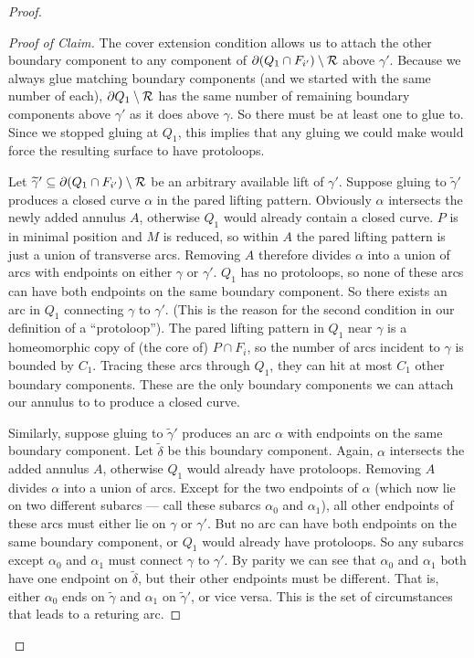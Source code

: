 \begin{proof}
\begin{proof}[Proof of Claim]
The cover extension condition allows us to attach the other boundary component
to any component of $\partial(Q_1 \cap F_{i'}) \setminus \mathcal{R}$ above $\gamma'$.
Because we always glue matching boundary components (and we started with the
same number of each), $\partial Q_1 \setminus \mathcal{R}$ has the same number of remaining
boundary components above $\gamma'$ as it does above $\gamma$. So there must be
at least one to glue to.  Since we stopped gluing at $Q_1$, this implies that
any gluing we could make would force the resulting surface to have protoloops.

Let $\widetilde{\gamma}' \subseteq \partial(Q_1 \cap F_{i'}) \setminus \mathcal{R}$ be an
arbitrary available lift of $\gamma'$.  Suppose gluing to $\widetilde{\gamma}'$
produces a closed curve $\alpha$ in the pared lifting pattern. Obviously
$\alpha$ intersects the newly added annulus $A$, otherwise $Q_1$ would already
contain a closed curve. $P$ is in minimal position and $M$ is reduced, so
within $A$ the pared lifting pattern is just a union of transverse arcs.
Removing $A$ therefore divides $\alpha$ into a union of arcs with endpoints on
either $\gamma$ or $\gamma'$.  $Q_1$ has no protoloops, so none of these arcs
can have both endpoints on the same boundary component. So there exists an arc
in $Q_1$ connecting $\gamma$ to $\gamma'$.  (This is the reason for the second
condition in our definition of a ``protoloop'').  The pared lifting pattern in
$Q_1$ near $\gamma$ is a homeomorphic copy of (the core of) $P \cap F_i$, so
the number of arcs incident to $\gamma$ is bounded by $C_1$.  Tracing these
arcs through $Q_1$, they can hit at most $C_1$ other boundary components.
These are the only boundary components we can attach our annulus to to produce
a closed curve.

Similarly, suppose gluing to $\widetilde{\gamma}'$ produces an arc $\alpha$
with endpoints on the same boundary component. Let $\widetilde{\delta}$ be this
boundary component. Again, $\alpha$ intersects the added annulus $A$, otherwise
$Q_1$ would already have protoloops. Removing $A$ divides $\alpha$ into a union
of arcs.  Except for the two endpoints of $\alpha$ (which now lie on two
different subarcs --- call these subarcs $\alpha_0$ and $\alpha_1$), all other
endpoints of these arcs must either lie on $\gamma$ or $\gamma'$.  But no arc
can have both endpoints on the same boundary component, or $Q_1$ would already
have protoloops.  So any subarcs except $\alpha_0$ and $\alpha_1$ must connect
$\gamma$ to $\gamma'$.  By parity we can see that $\alpha_0$ and $\alpha_1$
both have one endpoint on $\widetilde{\delta}$, but their other endpoints must
be different.  That is, either $\alpha_0$ ends on $\widetilde{\gamma}$ and
$\alpha_1$ on $\widetilde{\gamma}'$, or vice versa.  This is the set of
circumstances that leads to a returing arc.


\end{proof}
\end{proof}
